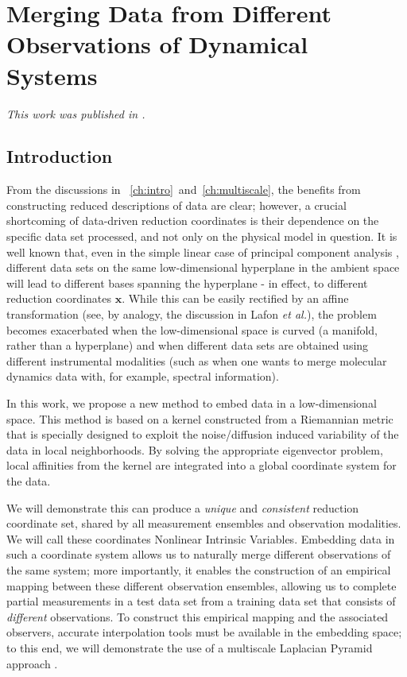 
\chapter{Merging Data from Different Observations of Dynamical Systems \label{ch:merging}}

\graphicspath{{ch-merging/figures/}}

{\em This work was published in \citep{dsilva2013nonlinear}.}

\section{Introduction}

From the discussions in \chap~\ref{ch:intro}~and~\ref{ch:multiscale}, the benefits from constructing reduced descriptions of data are clear; however, a crucial shortcoming of
 data-driven reduction coordinates is their dependence on the specific data set processed,
and not only on the physical model in question.
%
It is well known that, even in the simple linear case of principal component analysis \cite{jolliffe2005principal},
different data sets on the same low-dimensional hyperplane in the ambient space
will lead to different bases spanning the hyperplane - in effect, to different reduction coordinates $\mathbf{x}$.
%
While this can be easily rectified by an affine transformation
(see, by analogy, the discussion in Lafon {\em et al.}\cite{lafon2006data}),
the problem becomes
exacerbated when the low-dimensional space is curved (a manifold, rather than a hyperplane)
and when different data sets are obtained using different instrumental modalities
(such as when one wants to merge molecular dynamics data with, for example, spectral information).
%

In this work, we propose a new method to embed data in a low-dimensional space.
%
This method is based on a kernel constructed from a Riemannian metric that is specially designed to exploit the noise/diffusion induced variability of the data in local neighborhoods.
%
By solving the appropriate eigenvector problem, local affinities from the kernel are integrated into a global coordinate system for the data.

We will demonstrate this can produce a {\em unique} and {\em consistent} reduction
coordinate set, shared by all measurement ensembles and observation modalities.
%
We will call these coordinates Nonlinear Intrinsic Variables.
%
Embedding data in such a coordinate system allows us to naturally merge different observations of the same system;
more importantly, it enables the construction of an empirical mapping between these different
observation ensembles, allowing us to complete partial measurements in a test data set from a training data set
that consists of {\em different} observations.
%
To construct this empirical mapping and the associated observers,
accurate interpolation tools must be available in the embedding space; to this
end, we will demonstrate the use of a multiscale Laplacian Pyramid approach \cite{rabin2012heterogeneous}.

